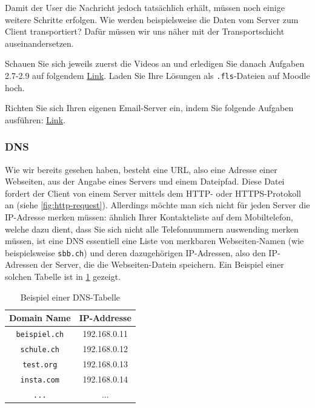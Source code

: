 Damit der User die Nachricht jedoch tatsächlich erhält, müssen noch einige weitere Schritte erfolgen. Wie werden beispielsweise die Daten vom Server zum Client transportiert? Dafür müssen wir uns näher mit der Transportschicht auseinandersetzen.

\begin{myexercise}
	Schauen Sie sich jeweils zuerst die Videos an und erledigen Sie danach Aufgaben 2.7-2.9 auf folgendem \href{https://informatik.mygymer.ch/base/?book=network}{Link}. Laden Sie Ihre Lösungen als \texttt{.fls}-Dateien auf Moodle hoch.
\end{myexercise}

\begin{mychallenge}
	Richten Sie sich Ihren eigenen Email-Server ein, indem Sie folgende Aufgaben ausführen: \href{https://inf-schule.de/rechnernetze/filius/internet/exkurs_email}{Link}.
\end{mychallenge}

\subsubsection{DNS}
Wie wir bereits gesehen haben, besteht eine \gls{URL}, also eine Adresse einer Webseiten, aus der Angabe eines Servers und einem Dateipfad. Diese Datei fordert der Client von einem Server mittels dem \gls{HTTP}- oder \gls{HTTPS}-Protokoll an (siehe \cref{fig:http-request}). Allerdings möchte man sich nicht für jeden Server die IP-Adresse merken müssen: ähnlich Ihrer Kontakteliste auf dem Mobiltelefon, welche dazu dient, dass Sie sich nicht alle Telefonnummern auswending merken müssen, ist eine \gls{DNS} essentiell eine Liste von merkbaren Webseiten-Namen (wie beispielsweise \texttt{sbb.ch}) und deren dazugehörigen \gls{IP}-Adressen, also den \gls{IP}-Adressen der Server, die die Webseiten-Datein speichern. Ein Beispiel einer solchen Tabelle ist in \cref{tab:dnsEntries} gezeigt.

\begin{table}[H]
	\centering
	\begin{tabular}{c|c}
		\textbf{Domain Name} & \textbf{IP-Addresse} \\
		\midrule\midrule
		\texttt{beispiel.ch} & 192.168.0.11         \\
		\midrule
		\texttt{schule.ch}   & 192.168.0.12         \\
		\midrule
		\texttt{test.org}    & 192.168.0.13         \\
		\midrule
		\texttt{insta.com}   & 192.168.0.14         \\
		\midrule
		\texttt{...}         & ...                  \\
	\end{tabular}
	\caption{Beispiel einer \gls{DNS}-Tabelle}
	\label{tab:dnsEntries}
\end{table}

